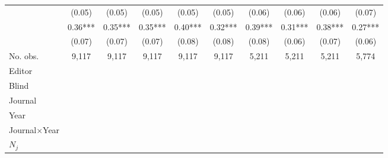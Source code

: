 \begin{table}
\begin{threeparttable}
\begin{tabular}{p{3cm}S@{}S@{}S@{}S@{}S@{}S@{}S@{}S@{}S@{}}
                                          &      (0.05)   &      (0.05)   &      (0.05)   &      (0.05)   &      (0.05)   &      (0.06)   &      (0.06)   &      (0.06)   &      (0.07)   \\
               &        0.36***&        0.35***&        0.35***&        0.40***&        0.32***&        0.39***&        0.31***&        0.38***&        0.27***\\
                                          &      (0.07)   &      (0.07)   &      (0.07)   &      (0.08)   &      (0.08)   &      (0.08)   &      (0.06)   &      (0.07)   &      (0.06)   \\
            \midrule
            No. obs.                      &       9,117   &       9,117   &       9,117   &       9,117   &       9,117   &       5,211   &       5,211   &       5,211   &       5,774   \\
            \midrule
            Editor               &           {}   &           {}   &           {}   &           {}   &           {}   &           {}   &           {}   &           {}   &           {}   \\
            Blind                         &           {}   &           {}   &           {}   &           {}   &           {}   &           {}   &           {}   &           {}   &           {}   \\
            Journal                       &           {}   &           {}   &               &               &               &               &               &               &               \\
            Year                          &               &           {}   &               &               &               &               &               &               &               \\
            Journal\(\times\)Year                  &               &               &           {}   &           {}   &           {}   &           {}   &           {}   &           {}   &           {}   \\
            \(N_j\)                       &               &               &               &           {}   &           {}   &           {}   &           {}   &           {}   &           {}   \\

\end{tabular}
\end{threeparttable}
\end{table}
